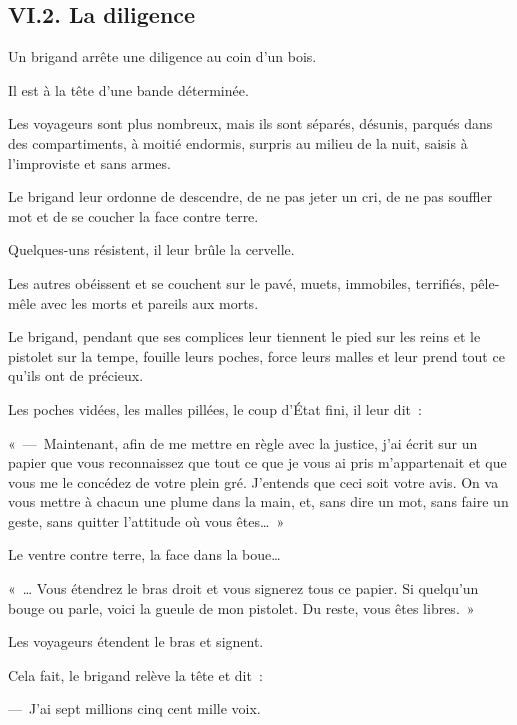 \documentclass[french,twoside]{book} %
\newenvironment{quoteblock}%
  {\begin{quoting}}
  {\end{quoting}}
\newenvironment{quotebar}{%
    \def\FrameCommand{{\color{rubric!10!}\vrule width 0.5em} \hspace{0.9em}}%
    \def\OuterFrameSep{\itemsep} %
    \MakeFramed {\advance\hsize-\width \FrameRestore}
  }%
  {%
    \endMakeFramed
  }
\renewenvironment{quoteblock}%
  {%
    \savenotes
    \setstretch{0.9}
    \normalfont
    \begin{quotebar}
  }
  {%
    \end{quotebar}
    \spewnotes
  }
\begin{document}
\subsection[{VI.2. La diligence}]{VI.2. La diligence}
\noindent Un brigand arrête une diligence au coin d’un bois.\par
Il est à la tête d’une bande déterminée.\par
Les voyageurs sont plus nombreux, mais ils sont séparés, désunis, parqués dans des compartiments, à moitié endormis, surpris au milieu de la nuit, saisis à l’improviste et sans armes.\par
Le brigand leur ordonne de descendre, de ne pas jeter un cri, de ne pas souffler mot et de se coucher la face contre terre.\par
Quelques-uns résistent, il leur brûle la cervelle.\par
Les autres obéissent et se couchent sur le pavé, muets, immobiles, terrifiés, pêle-mêle avec les morts et pareils aux morts.\par
Le brigand, pendant que ses complices leur tiennent le pied sur les reins et le pistolet sur la tempe, fouille leurs poches, force leurs malles et leur prend tout ce qu’ils ont de précieux.\par
Les poches vidées, les malles pillées, le coup d’État fini, il leur dit :\par

\begin{quoteblock}
 \noindent « — Maintenant, afin de me mettre en règle avec la justice, j’ai écrit sur un papier que vous reconnaissez que tout ce que je vous ai pris m’appartenait et que vous me le concédez de votre plein gré. J’entends que ceci soit votre avis. On va vous mettre à chacun une plume dans la main, et, sans dire un mot, sans faire un geste, sans quitter l’attitude où vous êtes… »
 \end{quoteblock}

\noindent Le ventre contre terre, la face dans la boue…\par

\begin{quoteblock}
 \noindent « … Vous étendrez le bras droit et vous signerez tous ce papier. Si quelqu’un bouge ou parle, voici la gueule de mon pistolet. Du reste, vous êtes libres. »
 \end{quoteblock}

\noindent Les voyageurs étendent le bras et signent.\par
Cela fait, le brigand relève la tête et dit :\par
— J’ai sept millions cinq cent mille voix.
\end{document}
